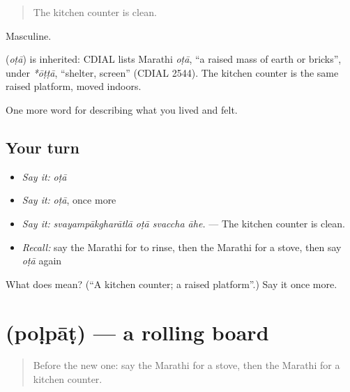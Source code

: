 \begin{quote}
The kitchen counter is clean.
\end{quote}

Masculine.

\begin{cousinweb}
\textbf{} (\emph{oṭā}) is inherited: CDIAL lists Marathi \emph{oṭā}, \textquotedblleft{}a raised mass of earth or bricks\textquotedblright{}, under \emph{*ōṭṭā}, \textquotedblleft{}shelter, screen\textquotedblright{} (CDIAL 2544). The kitchen counter is the same raised platform, moved indoors.
\end{cousinweb}

\begin{grammarlens}[title={What you've built}]
One more word for describing what you lived and felt.
\end{grammarlens}

\subsection*{Your turn}
\begin{itemize}
\raggedright
  \item \emph{Say it:} \emph{oṭā}
  \item \emph{Say it:} \emph{oṭā}, once more
  \item \emph{Say it:} \emph{svayampākgharātlā oṭā svaccha āhe.} — The kitchen counter is clean.
  \item \emph{Recall:} say the Marathi for to rinse, then the Marathi for a stove, then say \emph{oṭā} again
\end{itemize}

\begin{tcolorbox}[breakable,colback=teal!4,colframe=teal!35!black,title={Before you move on}]
What does  mean? (\textquotedblleft{}A kitchen counter; a raised platform\textquotedblright{}.) Say it once more.
\end{tcolorbox}
\section[\texorpdfstring{\mr{पोळपाट} (poḷpāṭ)}{पोळपाट (poḷpāṭ)}]{ (poḷpāṭ) — a rolling board}

\label{lesson:MR-C526-polpat}



\begin{quote}
Before the new one: say the Marathi for a stove, then the Marathi for a kitchen counter.
\end{quote}

